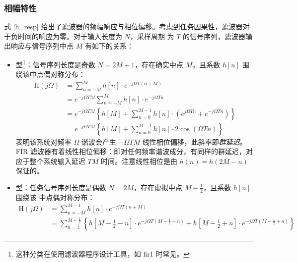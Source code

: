 \subsubsection{相幅特性}
式 \eqref{h_resp} 给出了滤波器的频幅响应与相位偏移。考虑到任务因果性，滤波器对于负时间的响应为零。对于输入长度为 $N$，采样周期
为 $T$ 的信号序列，滤波器输出响应与信号序列中点 $M$ 有如下的关系：
\begin{itemize}
    \item \uppercase\expandafter{} 型\footnote[1]{这种分类在使用滤波器程序设计工具，如 fir1 时常见。}：信号序列长度是奇数
          $N=2M+1$，存在确实中点 $M$，且系数 $h[n]$ 围绕该中点偶对称分布：
          \begin{align*}
              \mathrm{H}(j \Omega) & =\sum_{n=-M}^{M} h[n] \cdot e^{-j \Omega T(n+M)}                                      \\
                                   & =e^{-j \Omega T M} \sum_{n=-M}^{M} h[n] \cdot e^{-j \Omega Tn}                        \\
                                   & =e^{-j \Omega T M}
              \left\{
              h[M]+\sum_{n=0}^{M-1} h[n] \cdot\left(e^{j \Omega T n}+e^{-j \Omega T n}\right)
              \right\}                                                                                                     \\
                                   & =e^{-j \Omega T M}\left\{h[M]+\sum_{n=0}^{M-1} h[n] \cdot 2 \cos (\Omega T n)\right\}
          \end{align*}
          表明该系统对频率 $\Omega$ 谐波会产生 $-\Omega TM$ 线性相位偏移，此斜率即\emph{群延迟}\cite{oppenheim1997signals}。
          FIR 滤波器有着线性相位偏移：即对任何频率谐波成分，有同样的群延迟，对应于整个系统输入延迟 $TM$ 时间。注意线性相位是由 $h(n)=h(2M-n)$
          保证的。
    \item \uppercase\expandafter{} 型：任务信号序列长度是偶数 $N=2M$，存在虚拟中点 $M-\frac{1}{2}$，且系数 $h[n]$ 围绕该
          中点偶对称分布：
          \begin{align*}
              \mathrm{H}(j \Omega) & =\sum_{n=-M}^{M-1} h[n] \cdot e^{-j \Omega T(n+M)} \\
                                   & =\sum_{n=\frac{1}{2}}^{M-\frac{1}{2}}
              \left\{
              h[M-\frac{1}{2}-n] \cdot e^{-j \Omega T(M-\frac{1}{2}-n)}+
              h[M-\frac{1}{2}+n] \cdot e^{-j \Omega T(M-\frac{1}{2}+n)}
              \right\}                                                                  \\

\end{align*}
\end{itemize}
